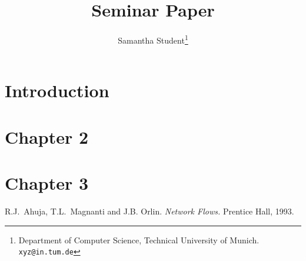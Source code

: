 \documentclass[11pt,psfig,times]{article}
\begin{document}
\title{Seminar Paper}
\author{Samantha Student\thanks{Department of Computer Science, Technical University of Munich. {\tt xyz@in.tum.de}}}
\date{}
\maketitle

\section{Introduction}

\section{Chapter 2}

\section{Chapter 3}



\begin{thebibliography}{10}
\setlength{\itemsep}{0pt plus .3pt}
\setlength{\parsep}{0pt plus .3pt}
\setlength{\parskip}{0pt plus .3pt}

R.J.\ Ahuja, T.L.\ Magnanti and J.B. Orlin. {\em Network Flows.\/} Prentice Hall, 1993.

\end{thebibliography}
\end{document}
